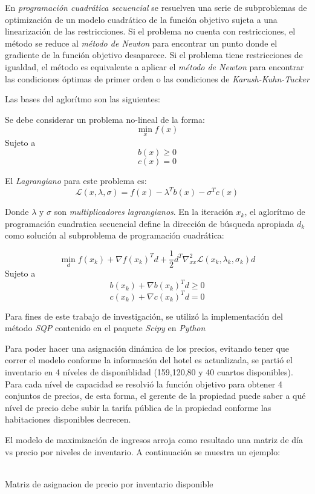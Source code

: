 En \emph{programación cuadrática secuencial} se resuelven una serie de subproblemas de optimización de un modelo cuadrático de la función objetivo sujeta a una linearización de las restricciones. Si el problema no cuenta con restricciones, el método se reduce al \emph{método de Newton} para encontrar un punto donde el gradiente de la función objetivo desaparece. Si el problema tiene restricciones de igualdad, el método es equivalente a aplicar el \emph{método de Newton} para encontrar las condiciones óptimas de primer orden o las condiciones de \emph{Karush-Kuhn-Tucker}

Las bases del aglorítmo son las siguientes:

Se debe considerar un problema no-lineal de la forma: $$\min_x f(x)$$ Sujeto a $$b(x) \geq 0$$ $$c(x) = 0$$

El \emph{Lagrangiano} para este problema es: $$\mathcal{L}(x,\lambda,\sigma)=f(x)-\lambda^Tb(x)-\sigma^Tc(x)$$

Donde $\lambda$ y $\sigma$ son \emph{multiplicadores lagrangianos}. En la iteración $x_k$, el aglorítmo de programación cuadratica secuencial define la dirección de búsqueda apropiada $d_k$ como solución al subproblema de programación cuadrática: 

$$\min_d f(x_k) + \nabla f(x_k)^T d + \frac{1}{2}d^T \nabla_{xx}^2 \mathcal{L} (x_k,\lambda_k,\sigma_k)d$$
Sujeto a
$$b(x_k) + \nabla b(x_k)^T d\geq 0$$
$$c(x_k) + \nabla c(x_k)^T d = 0$$

Para fines de este trabajo de investigación, se utilizó la implementación del método \emph{SQP} contenido en el paquete \emph{Scipy} en  \emph{Python}

Para poder hacer una asignación dinámica de los precios, evitando tener que correr el modelo conforme la información del hotel es actualizada, se partió el inventario en 4 níveles de disponiblidad (159,120,80 y 40 cuartos disponibles). Para cada nível de capacidad se resolvió la función objetivo para obtener 4 conjuntos de precios, de esta forma, el gerente de la propiedad puede saber a qué nível de precio debe subir la tarifa pública de la propiedad conforme las habitaciones disponibles decrecen.

El modelo de maximización de ingresos arroja como resultado una matriz de día vs precio por niveles de inventario. A continuación se muestra un ejemplo:
\\
\\

\begin{table}[H]
  \centering
  \par
  \caption{Matriz de asignacion de precio por inventario disponible} 
\end{table}

